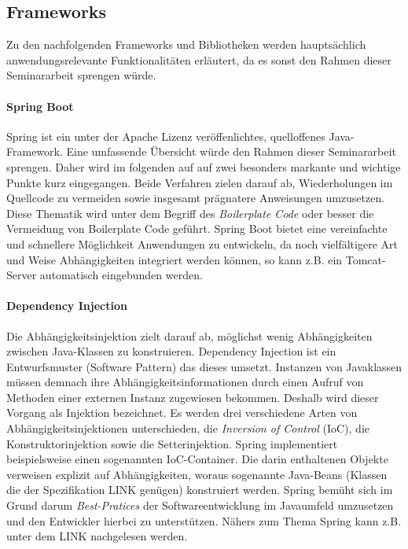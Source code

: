 \subsection{Frameworks}
Zu den nachfolgenden Frameworks und Bibliotheken werden hauptsächlich anwendungsrelevante Funktionalitäten erläutert, da es sonst den Rahmen dieser Seminararbeit sprengen würde.

\paragraph{Spring Boot}
Spring ist ein unter der Apache Lizenz veröffenlichtes, quelloffenes Java-Framework. Eine umfassende Übersicht würde den Rahmen dieser Seminararbeit sprengen. Daher wird im folgenden auf auf zwei besonders markante und wichtige Punkte kurz eingegangen. Beide Verfahren zielen darauf ab, Wiederholungen im Quellcode zu vermeiden sowie insgesamt prägnatere Anweisungen umzusetzen. Diese Thematik wird unter dem Begriff des \emph{Boilerplate Code} oder besser die Vermeidung von Boilerplate Code geführt. Spring Boot bietet eine vereinfachte und schnellere Möglichkeit Anwendungen zu entwickeln, da noch vielfältigere Art und Weise Abhängigkeiten integriert werden können, so kann z.B. ein Tomcat-Server automatisch eingebunden werden.  

\paragraph{Dependency Injection}
Die Abhängigkeitsinjektion zielt darauf ab, möglichst wenig Abhängigkeiten zwischen Java-Klassen zu konstruieren. Dependency Injection ist ein Entwurfsmuster (Software Pattern) das dieses umsetzt. Instanzen von Javaklassen müssen demnach ihre Abhängigkeitsinformationen durch einen Aufruf von Methoden einer externen Instanz zugewiesen bekommen. Deshalb wird dieser Vorgang als Injektion bezeichnet. Es werden drei verschiedene Arten von Abhängigkeitsinjektionen unterschieden, die \emph{Inversion of Control} (IoC), die Konstruktorinjektion sowie die Setterinjektion. Spring implementiert beispielsweise einen sogenannten IoC-Container. Die darin enthaltenen Objekte verweisen explizit auf Abhängigkeiten, woraus sogenannte Java-Beans (Klassen die der Spezifikation LINK genügen) konstruiert werden. Spring bemüht sich im Grund darum  \emph{Best-Pratices} der Softwareentwicklung im Javaumfeld umzusetzen und den Entwickler hierbei zu unterstützen. Nähers zum Thema Spring kann z.B. unter dem LINK nachgelesen werden.


